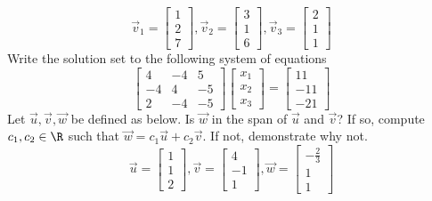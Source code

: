 \documentclass[12pt,addpoints]{exam}
\begin{document}
\begin{questions}
        \[
            \vec{v}_1 = \begin{bmatrix}
                1\\2\\7
            \end{bmatrix}, \vec{v}_2 = \begin{bmatrix}
                3 \\ 1 \\ 6
            \end{bmatrix}, \vec{v}_3 = \begin{bmatrix}
                2 \\ 1\\ 1
            \end{bmatrix}
        \]
        \vfill
        \newpage
        \question[15] Write the solution set to the following system of equations
        \[
            \begin{bmatrix}
                4 &-4 & 5 \\
                -4& 4 &-5 \\
                2 &-4 &-5
            \end{bmatrix}
            \begin{bmatrix} x_1 \\ x_2 \\ x_3 \end{bmatrix} =
            \begin{bmatrix} 11\\-11\\-21 \end{bmatrix}
        \]
        \vfill
        \newpage
        \question[15] Let $\vec{u},\vec{v},\vec{w}$ be defined as below. Is $\vec{w}$ in the span of
        $\vec{u}$ and $\vec{v}$? If so, compute $c_1,c_2\in\R$ such that $\vec{w} = c_1\vec{u} + c_2\vec{v}$. If not,
        demonstrate why not.
        \[
            \vec{u} = \begin{bmatrix} 1 \\ 1 \\ 2 \end{bmatrix}, \vec{v} = \begin{bmatrix} 4 \\ -1 \\ 1\end{bmatrix},
                \vec{w} = \begin{bmatrix} -\frac{2}{3} \\ 1 \\ 1\end{bmatrix}
        \]

\end{questions}
\end{document}
